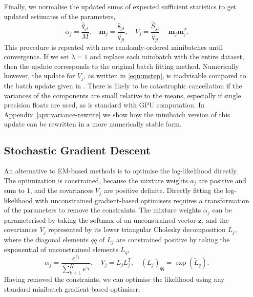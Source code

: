 \documentclass{article}
\newcommand{\bm}{\mathbf{m}}
\newcommand{\bs}{\mathbf{s}}
\begin{document}
Finally, we normalise the updated sums of expected sufficient statistics to get updated estimates of the parameters,
\begin{equation}
\alpha_{j} = \frac{\hat{q}_{jt}}{M}, \quad
\bm_{j} = \frac{\hat{\bs}_{jt}}{\hat{q}_{jt}}, \quad
V_{j} = \frac{\hat{S}_{jt}}{\hat{q}_{jt}} - \bm_{j} \bm_{j}^T.
\label{eqn:mstep}
\end{equation}
This procedure is repeated with new randomly-ordered minibatches until convergence.
If we set $\lambda=1$ and replace each minibatch with the entire dataset,
then the update corresponds to the original batch fitting method.
Numerically however, the update for $V_j$, as written in \eqref{eqn:mstep}, is inadvisable compared to the batch update given in \cite{bovyExtremeDeconvolutionInferring2011}. There is likely to be catastrophic cancellation if the variances of the components are small relative to the means, especially if single precision floats are used, as is standard with GPU computation.
In Appendix~\ref{apx:variance-rewrite} we show how the minibatch version of this update can be rewritten in a
more numerically stable form.


\subsection{Stochastic Gradient Descent}

An alternative to EM-based methods is to optimise the log-likelihood directly.
The optimization is constrained, because the mixture weights $a_j$ are positive and sum to $1$, and the covariances $V_j$ are positive definite.
Directly fitting the log-likelihood with unconstrained gradient-based optimisers requires a transformation of the parameters to remove the constraints.
The mixture weights $\alpha_j$ can be parameterised by taking the softmax of an unconstrained vector $\mathbf{z}$, and the covariances $V_j$ represented by its lower triangular Cholesky decomposition $L_j$, where the diagonal elements $qq$ of $L_j$ are constrained positive by taking the exponential of unconstrained elements $\tilde{L}_q$,
\begin{equation}
\alpha_j = \frac{e^{z_j}}{\sum_{k=1}^K e^{z_k}}, \quad
V_j = L_jL_j^T, \quad
(L_j)_{qq} = \exp({\tilde{L}_q}).
\end{equation}
Having removed the constraints, we can optimise the likelihood using any standard minibatch gradient-based optimiser.
\end{document}

